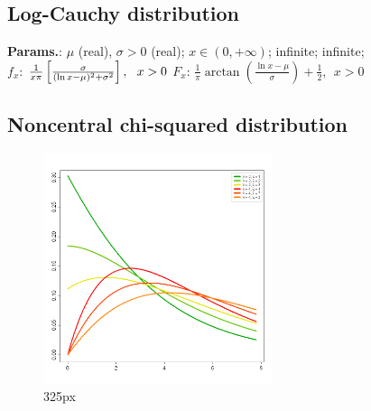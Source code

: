     
        
\subsection{Log-Cauchy distribution}





    {\color{darkblue} \textbf{Params.}:} {$\mu$ (real),  $\displaystyle \sigma > 0\!$ (real)}; {$\displaystyle x \in (0, +\infty)\!$}; {infinite}; {infinite};\hspace{0.5cm}\\{\color{darkblue} \textbf{$f_x$}:} {${ 1 \over x\pi } \left[ { \sigma \over (\ln x - \mu)^2 + \sigma^2  } \right], \ \ x>0$}{\color{darkblue} \textbf{$F_x$}:} {$\frac{1}{\pi} \arctan\left(\frac{\ln x-\mu}{\sigma}\right)+\frac{1}{2}, \ \ x>0$}



    
        
\subsection{Noncentral chi-squared distribution}


    \begin{figure}[H]
        \centering
        \includegraphics[width=0.6\textwidth]{images/Chi-Squared-(nonCentral)-pdf.png}
        \caption{325px}
    \end{figure}




